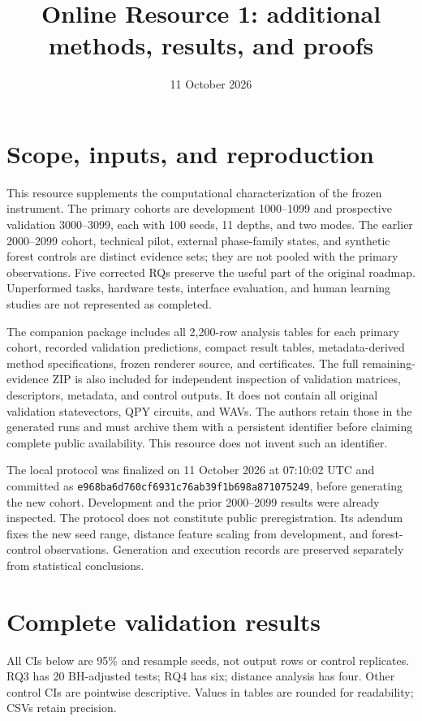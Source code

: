 \documentclass[11pt,a4paper]{article}
\title{Online Resource 1: additional methods, results, and proofs}\author{}\date{11 October 2026}
\begin{document}
\maketitle

\section{Scope, inputs, and reproduction}
This resource supplements the computational characterization of the frozen instrument. The primary cohorts are development 1000--1099 and prospective validation 3000--3099, each with 100 seeds, 11 depths, and two modes. The earlier 2000--2099 cohort, technical pilot, external phase-family states, and synthetic forest controls are distinct evidence sets; they are not pooled with the primary observations. Five corrected RQs preserve the useful part of the original roadmap. Unperformed tasks, hardware tests, interface evaluation, and human learning studies are not represented as completed.

The companion package includes all 2,200-row analysis tables for each primary cohort, recorded validation predictions, compact result tables, metadata-derived method specifications, frozen renderer source, and certificates. The full remaining-evidence ZIP is also included for independent inspection of validation matrices, descriptors, metadata, and control outputs. It does not contain all original validation statevectors, QPY circuits, and WAVs. The authors retain those in the generated runs and must archive them with a persistent identifier before claiming complete public availability. This resource does not invent such an identifier.

The local protocol was finalized on 11 October 2026 at 07:10:02 UTC and committed as \texttt{e968ba6d760cf6931c76ab39f1b698a871075249}, before generating the new cohort. Development and the prior 2000--2099 results were already inspected. The protocol does not constitute public preregistration. Its adendum fixes the new seed range, distance feature scaling from development, and forest-control observations. Generation and execution records are preserved separately from statistical conclusions.

\section{Complete validation results}
All CIs below are 95\% and resample seeds, not output rows or control replicates. RQ3 has 20 BH-adjusted tests; RQ4 has six; distance analysis has four. Other control CIs are pointwise descriptive. Values in tables are rounded for readability; CSVs retain precision.
\end{document}
